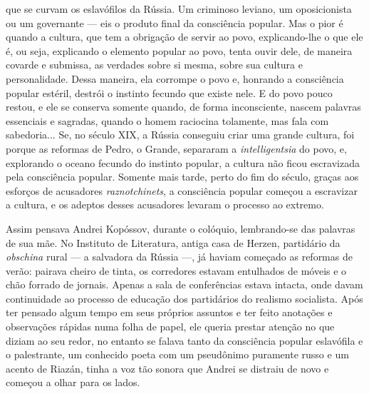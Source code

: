 que se curvam os eslavófilos da Rússia. Um criminoso leviano, um
oposicionista ou um governante --- eis o produto final da consciência
popular. Mas o pior é quando a cultura, que tem a obrigação de servir ao
povo, explicando-lhe o que ele é, ou seja, explicando o elemento popular
ao povo, tenta ouvir dele, de maneira covarde e submissa, as verdades
sobre si mesma, sobre sua cultura e personalidade. Dessa maneira, ela
corrompe o povo e, honrando a consciência popular estéril, destrói o
instinto fecundo que existe nele. E do povo pouco restou, e ele se
conserva somente quando, de forma inconsciente, nascem palavras
essenciais e sagradas, quando o homem raciocina tolamente, mas fala com
sabedoria... Se, no século XIX, a Rússia conseguiu criar uma grande
cultura, foi porque as reformas de Pedro, o Grande, separaram a
\emph{intelligentsia} do povo, e, explorando o oceano fecundo do
instinto popular, a cultura não ficou escravizada pela consciência
popular. Somente mais tarde, perto do fim do século, graças aos esforços
de acusadores \emph{raznotchinets}, a consciência popular começou a
escravizar a cultura, e os adeptos desses acusadores levaram o processo
ao extremo.

Assim pensava Andrei Kopóssov, durante o colóquio, lembrando-se das
palavras de sua mãe. No Instituto de Literatura, antiga casa de Herzen,
partidário da \emph{obschina} rural --- a salvadora da Rússia ---, já
haviam começado as reformas de verão: pairava cheiro de tinta, os
corredores estavam entulhados de móveis e o chão forrado de jornais.
Apenas a sala de conferências estava intacta, onde davam continuidade ao
processo de educação dos partidários do realismo socialista. Após ter
pensado algum tempo em seus próprios assuntos e ter feito anotações e
observações rápidas numa folha de papel, ele queria prestar atenção no
que diziam ao seu redor, no entanto se falava tanto da consciência
popular eslavófila e o palestrante, um conhecido poeta com um pseudônimo
puramente russo e um acento de Riazán, tinha a voz tão sonora que Andrei
se distraiu de novo e começou a olhar para os lados.

